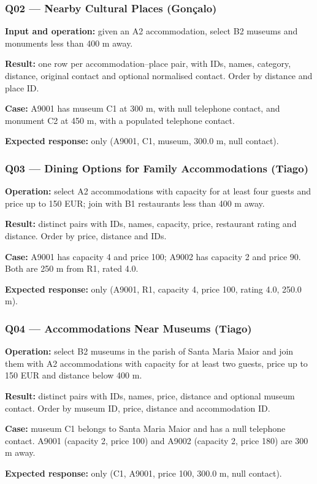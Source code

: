 \subsubsection{Q02 --- Nearby Cultural Places (Gonçalo)}
\textbf{Input and operation:} given an A2 accommodation, select B2 museums and monuments less than 400 m away.\par
\textbf{Result:} one row per accommodation--place pair, with IDs, names, category, distance, original contact and optional normalised contact. Order by distance and place ID.\par
\textbf{Case:} A9001 has museum C1 at 300 m, with null telephone contact, and monument C2 at 450 m, with a populated telephone contact.\par
\textbf{Expected response:} only (A9001, C1, museum, 300.0 m, null contact).
\subsubsection{Q03 --- Dining Options for Family Accommodations (Tiago)}
\textbf{Operation:} select A2 accommodations with capacity for at least four guests and price up to 150 EUR; join with B1 restaurants less than 400 m away.\par
\textbf{Result:} distinct pairs with IDs, names, capacity, price, restaurant rating and distance. Order by price, distance and IDs.\par
\textbf{Case:} A9001 has capacity 4 and price 100; A9002 has capacity 2 and price 90. Both are 250 m from R1, rated 4.0.\par
\textbf{Expected response:} only (A9001, R1, capacity 4, price 100, rating 4.0, 250.0 m).
\subsubsection{Q04 --- Accommodations Near Museums (Tiago)}
\textbf{Operation:} select B2 museums in the parish of Santa Maria Maior and join them with A2 accommodations with capacity for at least two guests, price up to 150 EUR and distance below 400 m.\par
\textbf{Result:} distinct pairs with IDs, names, price, distance and optional museum contact. Order by museum ID, price, distance and accommodation ID.\par
\textbf{Case:} museum C1 belongs to Santa Maria Maior and has a null telephone contact. A9001 (capacity 2, price 100) and A9002 (capacity 2, price 180) are 300 m away.\par
\textbf{Expected response:} only (C1, A9001, price 100, 300.0 m, null contact).
